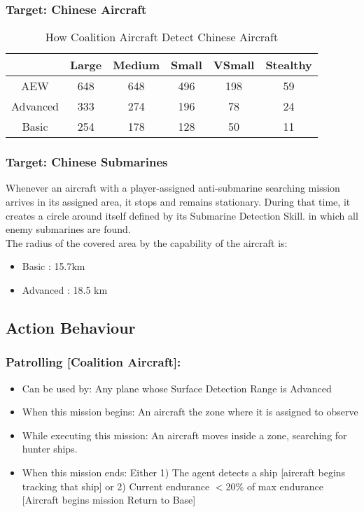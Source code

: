 \documentclass{article}
\begin{document}
    \subsubsection{Target: Chinese Aircraft}
        \begin{table}[h!]
            \centering
            \begin{tabular}{|c|c|c|c|c|c|}
            \hline
             & Large & Medium & Small & VSmall & Stealthy \\ \hline
            AEW & 648 & 648 & 496 & 198 & 59 \\ \hline
            Advanced & 333 & 274 & 196 & 78 & 24 \\ \hline
            Basic & 254 & 178 & 128 & 50 & 11 \\ \hline
            \end{tabular}
            \caption{How Coalition Aircraft Detect Chinese Aircraft}
        \end{table}

    \subsubsection{Target: Chinese Submarines} 
    
    Whenever an aircraft with a player-assigned anti-submarine searching mission arrives in its assigned area, it stops and remains stationary. During that time, it creates a circle around itself defined by its Submarine Detection Skill. in which all enemy submarines are found. \\
          
    The radius of the covered area by the capability of the aircraft is:
    
    \begin{itemize}
        \item Basic : 15.7km
        \item Advanced : 18.5 km
    \end{itemize}

\subsection{Action Behaviour}

    \subsubsection{Patrolling [Coalition Aircraft]:}
            \begin{itemize}
                \item{Can be used by:} Any plane whose Surface Detection Range is Advanced
                \item{When this mission begins:} An aircraft the zone where it is assigned to observe
                \item{While executing this mission:} An aircraft moves inside a zone, searching for hunter ships.
                \item{When this mission ends:} Either 1) The agent detects a ship [aircraft begins tracking that ship] or 2) Current endurance $<$20\% of max endurance [Aircraft begins mission Return to Base]
            \end{itemize}
\end{document}
